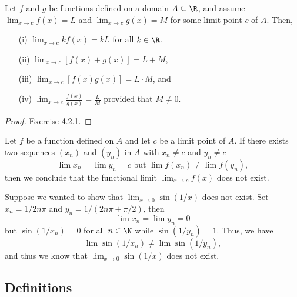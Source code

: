 \begin{tcolorbox}
    \begin{cor}
    Let \( f \) and \( g \) be functions defined on a domain \( A \subseteq \R  \), and assume \( \lim_{ x \to c } f(x) = L  \) and \( \lim_{ x \to c } g(x) = M  \) for some limit point \( c \) of \( A  \). Then, 
    \begin{enumerate}
        \item[(i)] \( \lim_{ x \to c } kf(x) = kL  \) for all \( k \in \R  \),
        \item[(ii)] \( \lim_{ x \to c } [f(x) + g(x)] = L + M, \)
        \item[(iii)] \( \lim_{ x \to c } [f(x)g(x)] = L \cdot M  \), and 
        \item[(iv)] \( \lim_{ x \to c } \frac{ f(x) }{ g(x)  } = \frac{ L }{ M }  \) provided that \( M \neq  0 \).
    \end{enumerate}
    \end{cor}
\end{tcolorbox}

\begin{proof}
Exercise 4.2.1.
\end{proof}


\begin{tcolorbox}
    \begin{cor}
    Let \( f \) be a function defined on \( A  \) and let \( c  \) be a limit point of \( A  \). If there exists two sequences \( (x_n) \) and \( (y_n) \) in \( A  \) with \( x_n \neq  c \) and \( y_n \neq c  \) 
    \[  \lim x_n = \lim y_n = c \text{~but~} \lim f(x_n) \neq \lim f(y_n),  \]
    then we conclude that the functional limit \( \lim_{x \to c } f(x)  \) does not exist.
    \end{cor}
\end{tcolorbox}

\begin{ex}
Suppose we wanted to show that \( \lim_{ x \to 0 } \sin(1/x) \) does not exist. Set \( x_n = 1/2n\pi \) and \( y_n = 1 / (2n\pi + \pi/2 ) \), then 
\[  \lim x_n = \lim y_n = 0  \] but
\( \sin(1/x_n) = 0  \) for all \( n \in \N  \) while \( \sin(1/y_n) = 1  \). Thus, we have 
\[  \lim \sin(1/x_n) \neq \lim  \sin (1/y_n), \]
and thus we know that \( \lim_{x \to  0 } \sin(1/x)  \) does not exist.
\end{ex}

\subsection{Definitions}



